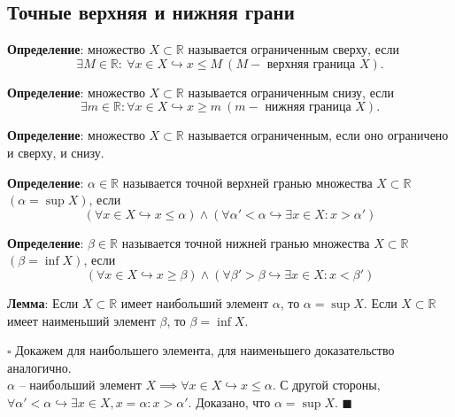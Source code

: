 \documentclass[12pt, a4paper, reqno]{article}
\begin{document}
\subsection{Точные верхняя и нижняя грани}

    \textbf{Определение}: множество $X \subset \mathbb{R}$ называется ограниченным сверху, если
    \begin{equation*}
        \exists M\in\mathbb{R}:\ \forall x\in X \hookrightarrow x \leq M\
        (M - \text{ верхняя граница } X).
    \end{equation*}

    \textbf{Определение}: множество $X \subset \mathbb{R}$ называется ограниченным снизу, если
    \begin{equation*}
        \exists m\in\mathbb{R}: \forall x\in X \hookrightarrow x \geq m\
        (m - \text{ нижняя граница } X).
    \end{equation*}

    \textbf{Определение}: множество $X \subset \mathbb{R}$ называется ограниченным, если оно
    ограничено и сверху, и снизу.

    \textbf{Определение}: $\alpha\in\mathbb{R}$ называется точной верхней гранью множества
    $X \subset \mathbb{R}$ $(\alpha = \sup X)$, если
    \begin{equation*}
        (\forall x\in X \hookrightarrow x \leq\alpha)\wedge
        (\forall\alpha' < \alpha \hookrightarrow \exists x\in X: x > \alpha')
    \end{equation*}

    \textbf{Определение}: $\beta\in\mathbb{R}$ называется точной нижней гранью множества
    $X \subset \mathbb{R}$ $(\beta = \inf X)$, если
    \begin{equation*}
        (\forall x\in X \hookrightarrow x \geq\beta)\wedge
        (\forall\beta' > \beta \hookrightarrow \exists x\in X: x < \beta')
    \end{equation*}

    \textbf{Лемма}: Если $X \subset \mathbb{R}$ имеет наибольший элемент $\alpha$, то $\alpha = \sup X$.
    Если $X \subset \mathbb{R}$ имеет наименьший элемент $\beta$, то $\beta = \inf X$.

    $\square$ Докажем для наибольшего элемента, для наименьшего доказательство аналогично.\\
    $\alpha$ -- наибольший элемент $X \implies \forall x\in X \hookrightarrow x \leq \alpha$. С другой
    стороны, $\forall\alpha' < \alpha \hookrightarrow \exists x\in X, x = \alpha: x > \alpha'$.
    Доказано, что $\alpha = \sup X$. $\blacksquare$
\end{document}
